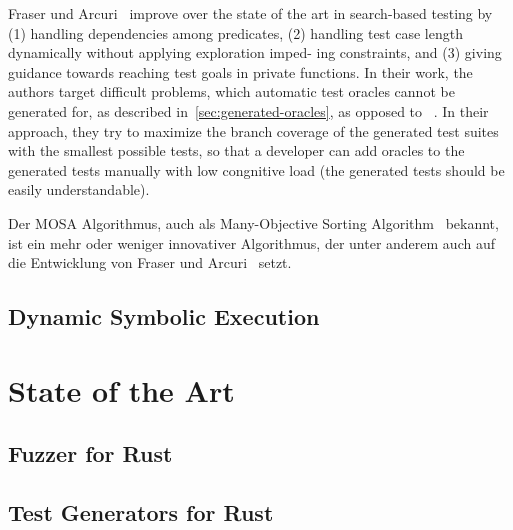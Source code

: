 \documentclass{article}
\begin{document}
Fraser und Arcuri~\cite{Fraser_2011} improve over the state of the art in search-based testing by (1) handling dependencies among predicates, (2) handling test case length dynamically without applying exploration imped- ing constraints, and (3) giving guidance towards reaching test goals in private functions. In their work, the authors target difficult problems, which automatic test oracles cannot be generated for, as described in~\cref{sec:generated-oracles}, as opposed to~\cite{Pacheco_2007, Godefroid_2005} . In their approach, they try to maximize the branch coverage of the generated test suites with the smallest possible tests, so that a developer can add oracles to the generated tests manually with low congnitive load (the generated tests should be easily understandable).

Der MOSA Algorithmus, auch als Many-Objective Sorting Algorithm~\cite{Panichella_2015} bekannt, ist ein mehr oder weniger innovativer Algorithmus, der unter anderem auch auf die Entwicklung von Fraser und Arcuri~\cite{Fraser_2013} setzt. 
\subsection{Dynamic Symbolic Execution}


\section{State of the Art}
\subsection{Fuzzer for Rust}
\subsection{Test Generators for Rust}
\end{document}
